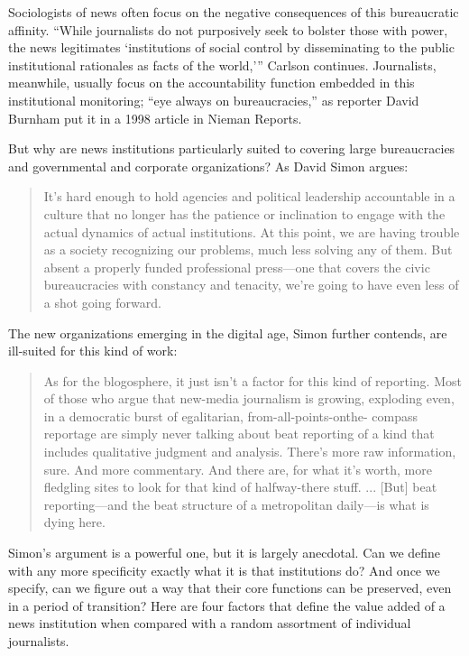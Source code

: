 Sociologists of news often focus on the negative consequences of this bureaucratic
affinity. ``While journalists do not purposively seek to bolster those with
power, the news legitimates ‘institutions of social control by disseminating to the
public institutional rationales as facts of the world,’'' Carlson continues. Journalists,
meanwhile, usually focus on the accountability function embedded in this
institutional monitoring; ``eye always on bureaucracies,'' as reporter David Burnham
put it in a 1998 article in Nieman Reports.

But why are news institutions particularly suited to covering large bureaucracies
and governmental and corporate organizations? As David Simon argues:

\begin{quote}It’s hard enough to hold agencies and political leadership accountable
in a culture that no longer has the patience or inclination to engage
with the actual dynamics of actual institutions. At this point, we are
having trouble as a society recognizing our problems, much less solving
any of them. But absent a properly funded professional press—one that
covers the civic bureaucracies with constancy and tenacity, we’re going
to have even less of a shot going forward.
\end{quote}
The new organizations emerging in the digital age, Simon further contends, are
ill-suited for this kind of work:

\begin{quote}As for the blogosphere, it just isn’t a factor for this kind of reporting.
Most of those who argue that new-media journalism is growing, exploding
even, in a democratic burst of egalitarian, from-all-points-onthe-
compass reportage are simply never talking about beat reporting of a kind that includes qualitative judgment and analysis. There’s more
raw information, sure. And more commentary. And there are, for what
it’s worth, more fledgling sites to look for that kind of halfway-there
stuff. ... [But] beat reporting—and the beat structure of a metropolitan
daily—is what is dying here.
\end{quote}

Simon’s argument is a powerful one, but it is largely anecdotal. Can we define
with any more specificity exactly what it is that institutions do? And once we
specify, can we figure out a way that their core functions can be preserved, even in
a period of transition? Here are four factors that define the value added of a news
institution when compared with a random assortment of individual journalists.

